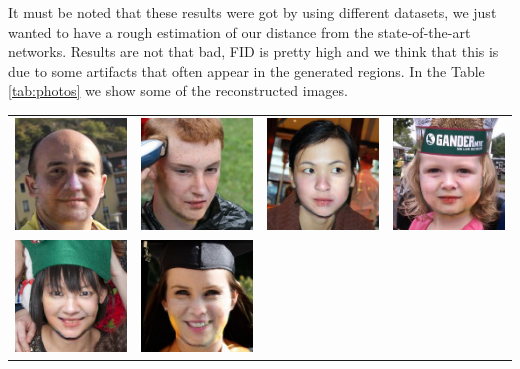 \documentclass[10pt,twocolumn,letterpaper]{article}
\begin{document}
It must be noted that these results were got by using different datasets, we
just wanted to have a rough estimation of our distance from the state-of-the-art
networks.
Results are not that bad, FID is pretty high and we think that this is due to
some artifacts that often appear in the generated regions.
In the Table \ref{tab:photos} we show some of the reconstructed images.
\begin{table}
  \begin{tabular}{cccc}
    \includegraphics[width=.2\linewidth]{samples/00045.jpg}&
    \includegraphics[width=.2\linewidth]{samples/00053.jpg}&
    \includegraphics[width=.2\linewidth]{samples/00099.jpg}&
    \includegraphics[width=.2\linewidth]{samples/00146.jpg}\\
    \includegraphics[width=.2\linewidth]{samples/00202.jpg}&
    \includegraphics[width=.2\linewidth]{samples/00298.jpg}&

\end{tabular}
\end{table}
\end{document}
